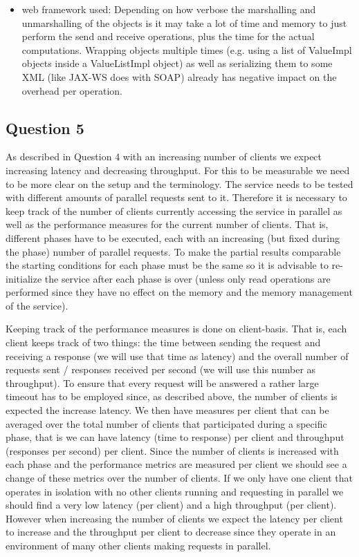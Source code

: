 \documentclass[12pt,a4paper]{article}
\begin{document}
\begin{itemize}
  \item web framework used: Depending on how verbose the marshalling and unmarshalling of the objects is it may take a lot of time and memory to just perform the send and receive operations, plus the time for the actual computations. Wrapping objects multiple times (e.g. using a list of ValueImpl objects inside a ValueListImpl object) as well as serializing them to some XML (like JAX-WS does with SOAP) already has negative impact on the overhead per operation.
\end{itemize}

\subsection*{Question 5}
\label{sec:pq5}
  As described in Question 4 with an increasing number of clients we expect increasing latency and decreasing throughput. For this to be measurable we need to be more clear on the setup and the terminology. The service needs to be tested with different amounts of parallel requests sent to it. Therefore it is necessary to keep track of the number of clients currently accessing the service in parallel as well as the performance measures for the current number of clients. That is, different phases have to be executed, each with an increasing (but fixed during the phase) number of parallel requests. To make the partial results comparable the starting conditions for each phase must be the same so it is advisable to re-initialize the service after each phase is over (unless only read operations are performed since they have no effect on the memory and the memory management of the service).
  
  Keeping track of the performance measures is done on client-basis. That is, each client keeps track of two things: the time between sending the request and receiving a response (we will use that time as latency) and the overall number of requests sent / responses received per second (we will use this number as throughput). To ensure that every request will be answered a rather large timeout has to be employed since, as described above, the number of clients is expected the increase latency. We then have measures per client that can be averaged over the total number of clients that participated during a specific phase, that is we can have latency (time to response) per client and throughput (responses per second) per client. Since the number of clients is increased with each phase and the performance metrics are measured per client we should see a change of these metrics over the number of clients. If we only have one client that operates in isolation with no other clients running and requesting in parallel we should find a very low latency (per client) and a high throughput (per client). However when increasing the number of clients we expect the latency per client to increase and the throughput per client to decrease since they operate in an environment of many other clients making requests in parallel.
  
\end{document}
